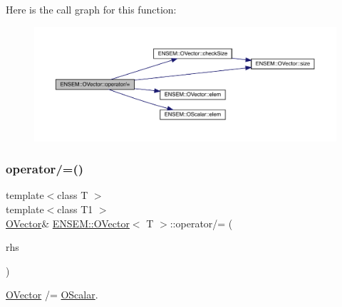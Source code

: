 Here is the call graph for this function\+:
\nopagebreak
\begin{figure}[H]
\begin{center}
\leavevmode
\includegraphics[width=350pt]{d0/d8d/classENSEM_1_1OVector_aa26be39a0620d0cdc1685bc2f1cc31a5_cgraph}
\end{center}
\end{figure}
\mbox{\label{classENSEM_1_1OVector_aa26be39a0620d0cdc1685bc2f1cc31a5}} 
\subsubsection{\texorpdfstring{operator/=()}{operator/=()}\hspace{0.1cm}{\footnotesize\ttfamily [3/6]}}
{\footnotesize\ttfamily template$<$class T $>$ \\
template$<$class T1 $>$ \\
\mbox{\hyperlink{classENSEM_1_1OVector}{O\+Vector}}\& \mbox{\hyperlink{classENSEM_1_1OVector}{E\+N\+S\+E\+M\+::\+O\+Vector}}$<$ T $>$\+::operator/= (\begin{DoxyParamCaption}\item[{const \mbox{\hyperlink{classENSEM_1_1OScalar}{O\+Scalar}}$<$ T1 $>$ \&}]{rhs }\end{DoxyParamCaption})\hspace{0.3cm}{\ttfamily [inline]}}



\mbox{\hyperlink{classENSEM_1_1OVector}{O\+Vector}} /= \mbox{\hyperlink{classENSEM_1_1OScalar}{O\+Scalar}}. 

